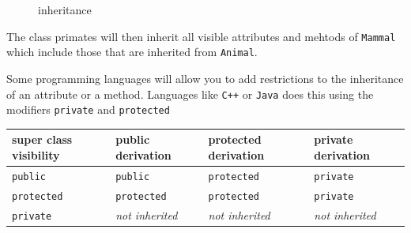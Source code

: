 \begin{figure}
\centering
{}
\caption{inheritance}
\end{figure}

The class primates will then inherit all visible attributes and mehtods
of \texttt{Mammal} which include those that are inherited from
\texttt{Animal}.

Some programming languages will allow you to add restrictions to the
inheritance of an attribute or a method. Languages like \texttt{C++} or
\texttt{Java} does this using the modifiers \texttt{private} and
\texttt{protected}

\begin{longtable}[]{@{}
  >{\raggedright\arraybackslash}p{}
  >{\raggedright\arraybackslash}p{}
  >{\raggedright\arraybackslash}p{}
  >{\raggedright\arraybackslash}p{}@{}}
\toprule\noalign{}
\begin{minipage}[b]{\linewidth}\raggedright
super class visibility
\end{minipage} & \begin{minipage}[b]{\linewidth}\raggedright
public derivation
\end{minipage} & \begin{minipage}[b]{\linewidth}\raggedright
protected derivation
\end{minipage} & \begin{minipage}[b]{\linewidth}\raggedright
private derivation
\end{minipage} \\
\midrule\noalign{}
\endhead
\bottomrule\noalign{}
\endlastfoot
\texttt{public} & \texttt{public} & \texttt{protected} &
\texttt{private} \\
\texttt{protected} & \texttt{protected} & \texttt{protected} &
\texttt{private} \\
\texttt{private} & \emph{not inherited} & \emph{not inherited} &
\emph{not inherited} \\
\end{longtable}

